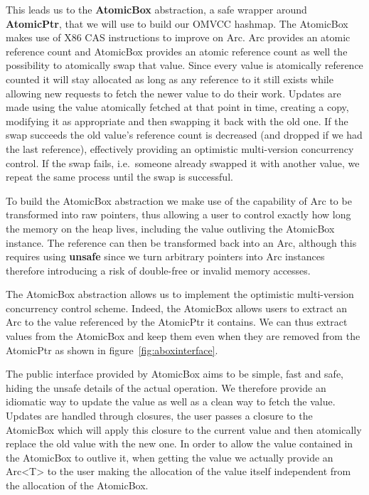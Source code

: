 

This leads us to the \textbf{AtomicBox} abstraction, a safe wrapper
around \textbf{AtomicPtr}, that we will use to build our OMVCC
hashmap. The AtomicBox makes use of X86 CAS instructions to improve on
Arc. Arc provides an atomic reference count and AtomicBox provides an
atomic reference count as well the possibility to atomically swap that
value. Since every value is atomically reference counted it will stay
allocated as long as any reference to it still exists while allowing
new requests to fetch the newer value to do their work. Updates are
made using the value atomically fetched at that point in time,
creating a copy, modifying it as appropriate and then swapping it back
with the old one. If the swap succeeds the old value's reference count
is decreased (and dropped if we had the last reference), effectively
providing an optimistic multi-version concurrency control. If the swap
fails, i.e.\ someone already swapped it with another value, we repeat
the same process until the swap is successful.

To build the AtomicBox abstraction we make use of the capability of
Arc to be transformed into raw pointers, thus allowing a user to
control exactly how long the memory on the heap lives, including the
value outliving the AtomicBox instance. The reference can then be
transformed back into an Arc, although this requires using
\textbf{unsafe} since we turn arbitrary pointers into Arc instances
therefore introducing a risk of double-free or invalid memory
accesses.



The AtomicBox abstraction allows us to implement the optimistic
multi-version concurrency control scheme. Indeed, the AtomicBox allows
users to extract an Arc to the value referenced by the AtomicPtr it
contains. We can thus extract values from the AtomicBox and keep them
even when they are removed from the AtomicPtr as shown in
figure~\ref{fig:aboxinterface}.

The public interface provided by AtomicBox aims to be simple, fast and
safe, hiding the unsafe details of the actual operation. We therefore
provide an idiomatic way to update the value as well as a clean way to
fetch the value. Updates are handled through closures, the user passes
a closure to the AtomicBox which will apply this closure to the
current value and then atomically replace the old value with the new
one. In order to allow the value contained in the AtomicBox to outlive
it, when getting the value we actually provide an Arc<T> to the user
making the allocation of the value itself independent from the
allocation of the AtomicBox.

